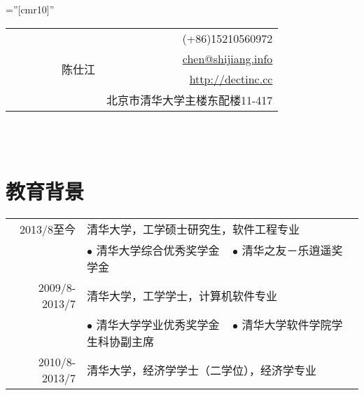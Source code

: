 \documentclass[a4paper,10pt]{professional-cv-cn}
\begin{document}

\pagestyle{empty} %

\font\fb=''[cmr10]'' %

\begin{tabular}{lr}
\multirow{4}{24em}{\Huge ~~~~~~~~~陈仕江}
    & (+86)15210560972 \\
    & \href{mailto:chen@shijiang.info}{chen@shijiang.info} \\
    & \href{http://dectinc.cc}{http://dectinc.cc} \\
    & 北京市清华大学主楼东配楼11-417
\end{tabular}
\\
\\



\section{教育背景}
\begin{tabular}{rl}
 \textsc{2013/8至今} & 清华大学，工学硕士研究生，软件工程专业 \\
 & \small{$\bullet$ 清华大学综合优秀奖学金 ~ $\bullet$ 清华之友－乐逍遥奖学金} \\
 \textsc{2009/8-2013/7} & 清华大学，工学学士，计算机软件专业 \\
 & \small{$\bullet$ 清华大学学业优秀奖学金 ~ $\bullet$ 清华大学软件学院学生科协副主席} \\
 \textsc{2010/8-2013/7} & 清华大学，经济学学士（二学位），经济学专业
\end{tabular}
\end{document}
